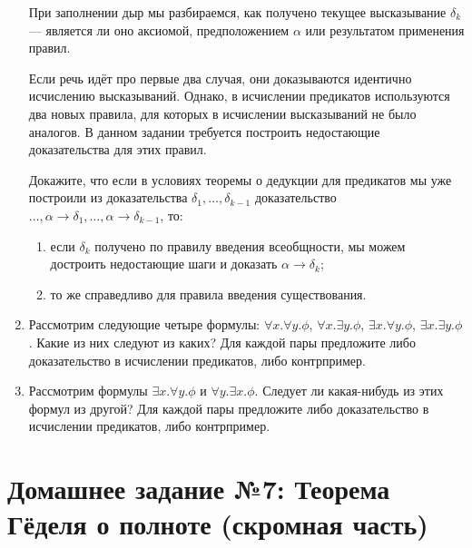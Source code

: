\documentclass[10pt,a4paper,oneside]{article}
\begin{document}
\begin{enumerate}
При заполнении дыр мы разбираемся, как получено текущее высказывание
$\delta_k$ --- является ли оно аксиомой, предположением $\alpha$ или
результатом применения правил.

Если речь идёт про первые два случая, они доказываются идентично исчислению
высказываний. Однако, в исчислении предикатов используются два новых
правила, для которых в исчислении высказываний не было аналогов.
В данном задании требуется построить недостающие доказательства для этих
правил. 

Докажите, что если в условиях теоремы о дедукции для предикатов
мы уже построили из доказательства $\delta_1, \dots, \delta_{k-1}$
доказательство 
$\dots, \alpha\rightarrow\delta_1, \dots, \alpha\rightarrow\delta_{k-1}$, то:
\begin{enumerate}
\item если $\delta_k$ получено по правилу введения всеобщности, 
мы можем достроить недостающие шаги и доказать $\alpha\rightarrow\delta_k$;
\item то же справедливо для правила введения существования.
\end{enumerate}

\item Рассмотрим следующие четыре формулы: $\forall x.\forall y.\phi$,
$\forall x.\exists y.\phi$, $\exists x.\forall y.\phi$, $\exists x.\exists y.\phi$.
Какие из них следуют из каких? Для каждой пары предложите либо доказательство
в исчислении предикатов, либо контрпример.
\item Рассмотрим формулы $\exists x.\forall y.\phi$ и $\forall y.\exists x.\phi$.
Следует ли какая-нибудь из этих формул из другой?
Для каждой пары предложите либо доказательство в исчислении предикатов, 
либо контрпример.

\end{enumerate}

\section*{Домашнее задание №7: Теорема Гёделя о полноте (скромная часть)}
\end{document}
